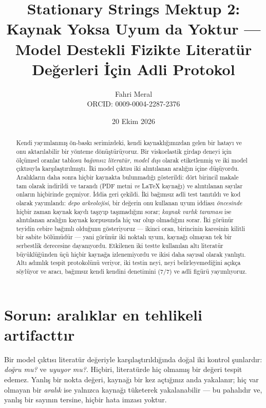 \documentclass[11pt,a4paper]{article}
\title{\textbf{Stationary Strings Mektup 2: Kaynak Yoksa Uyum da Yoktur --- Model Destekli Fizikte Literatür\\
Değerleri İçin Adli Protokol}}
\author{Fahri Meral\\[0.2em]\small ORCID: 0009-0004-2287-2376}
\date{20 Ekim 2026}
\begin{document}
\shorthandoff{=}

\maketitle

\begin{abstract}
Kendi yayımlanmış ön-baskı serimizdeki, kendi kaynaklığımızdan gelen bir hatayı
ve onu aktarılabilir bir yönteme dönüştürüyoruz. Bir viskoelastik girdap
deneyi için ölçümsel oranlar tablosu \emph{bağımsız literatür, model dışı}
 olarak etiketlenmiş ve iki model çıktısıyla karşılaştırılmıştı. İki model
çıktısı iki alıntılanan aralığın içine düşüyordu. Aralıkların daha sonra
hiçbir kaynakta bulunmadığı gösterildi: dört birincil makale tam olarak
indirildi ve tarandı (PDF metni \emph{ve} LaTeX kaynağı) ve alıntılanan
sayılar onların hiçbirinde geçmiyor. İddia geri çekildi. İki bağımsız adli
test tanıtıldı ve kod olarak yayımlandı: \emph{depo arkeolojisi}, bir
değerin onu kullanan uyum iddiası \emph{öncesinde} hiçbir zaman kaynak kaydı
taşıyıp taşımadığını sorar; \emph{kaynak varlık taraması} ise alıntılanan
aralığın kaynak korpusunda hiç var olup olmadığını sorar. İki görünür teyidin
cebire bağımlı olduğunu gösteriyoruz --- ikinci oran, birincinin karesinin
kilitli bir sabite bölümüdür --- yani görünür iki noktalı uyum, kaynağı
olmayan tek bir serbestlik derecesine dayanıyordu. Etkilenen iki testte
kullanılan altı literatür büyüklüğünden üçü hiçbir kaynağa izlenemiyordu ve
ikisi daha sayısal olarak yanlıştı. Altı adımlık tespit protokolünü
veriyor, iki testin neyi, neyi belirleyemediğini açıkça söylüyor ve aracı,
bağımsız kendi kendini denetimini (7/7) ve adli figürü yayımlıyoruz.
\end{abstract}

\section{Sorun: aralıklar en tehlikeli artifacttır}
Bir model çıktısı literatür değeriyle karşılaştırıldığında doğal iki kontrol
şunlardır: \emph{doğru mu?} ve \emph{uyuyor mu?}. Hiçbiri, literatürde hiç
olmamış bir değeri tespit edemez. Yanlış bir nokta değeri, kaynağı bir kez
açtığınız anda yakalanır; hiç var olmayan bir \emph{aralık} ise yalnızca
kaynağı tüketerek yakalanabilir — bu pahalıdır ve, yanlış bir sayının
tersine, hiçbir hata imzası yoktur.
\end{document}
